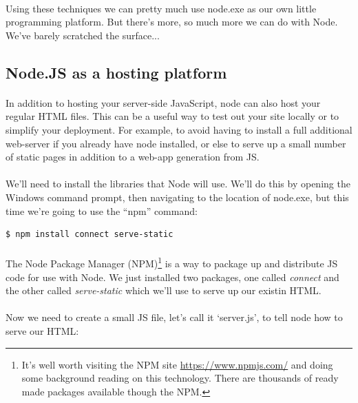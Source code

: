 \documentclass[10pt, a4paper, twosize]{article}
\begin{document}
\paragraph{} Using these techniques we can pretty much use node.exe as our own little programming platform. But there's more, so much more we can do with Node. We've barely scratched the surface...

\subsection{Node.JS as a hosting platform}
\paragraph{} In addition to hosting your server-side JavaScript, node can also host your regular HTML files. This can be a useful way to test out your site locally or to simplify your deployment. For example, to avoid having to install a full additional web-server if you already have node installed, or else to serve up a small number of static pages in addition to a web-app generation from JS. 

\paragraph{} We'll need to install the libraries that Node will use. We'll do this by opening the Windows command prompt, then navigating to the location of node.exe, but this time we're going to use the ``npm'' command:

\begin{lstlisting}[style=DOS]
$ npm install connect serve-static
\end{lstlisting}

\paragraph{} The Node Package Manager (NPM)\footnote{It's well worth visiting the NPM site \url{https://www.npmjs.com/} and doing some background reading on this technology. There are thousands of ready made packages available though the NPM.} is a way to package up and distribute JS code for use with Node. We just installed two packages, one called \emph{connect} and the other called \emph{serve-static} which we'll use to serve up our existin HTML.

\paragraph{} Now we need to create a small JS file, let's call it `server.js', to tell node how to serve our HTML:
\end{document}
